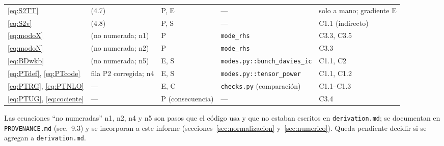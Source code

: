 \begin{longtable}{@{}L{2.0cm}L{2.4cm}L{1.0cm}L{5.2cm}L{2.7cm}@{}}
\eqref{eq:S2TT} & (4.7) & P, E & --- & solo a mano; gradiente E\\
\eqref{eq:S2v} & (4.8) & P, S & --- & C1.1 (indirecto)\\
\eqref{eq:modoX} & (no numerada; n1) & P & \texttt{mode\_rhs} & C3.3, C3.5\\
\eqref{eq:modoN} & (no numerada; n2) & P & \texttt{mode\_rhs} & C3.3\\
\eqref{eq:BDwkb} & (no numerada; n5) & E, S & \texttt{modes.py::bunch\_davies\_ic} & C1.1, C2\\
\eqref{eq:PTdef}, \eqref{eq:PTcode} & fila P2 corregida; n4 & E, S & \texttt{modes.py::tensor\_power} & C1.1, C1.2\\
\eqref{eq:PTRG}, \eqref{eq:PTNLO} & --- & E, C & \texttt{checks.py} (comparación) & C1.1--C1.3\\
\eqref{eq:PTUG}, \eqref{eq:cociente} & --- & P (consecuencia) & --- & C3.4\\
\end{longtable}
\normalsize

Las ecuaciones ``no numeradas'' n1, n2, n4 y n5 son pasos que el código usa y que no estaban escritos en \texttt{derivation.md}; se documentan en \texttt{PROVENANCE.md} (sec.~9.3) y se incorporan a este informe (secciones~\ref{sec:normalizacion} y~\ref{sec:numerico}). Queda pendiente decidir si se agregan a \texttt{derivation.md}.
